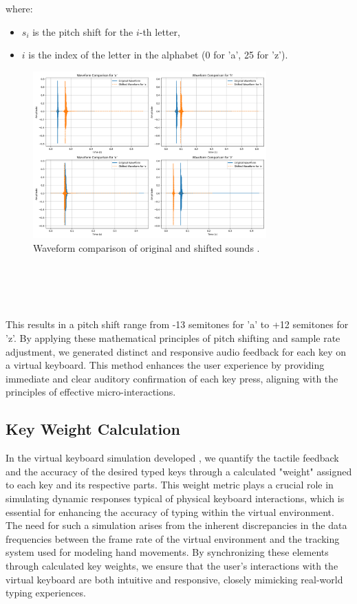 where:
\begin{itemize}
  \item \( s_i \) is the pitch shift for the \( i \)-th letter,
  \item \( i \) is the index of the letter in the alphabet (0 for 'a', 25 for 'z').
\end{itemize}

\begin{figure}[h!]
\centering
\includegraphics[width=0.8\textwidth]{Development/waveform_comparison_combined.png}
\caption{Waveform comparison of original and shifted sounds .}
\end{figure} 
\noindent \\\\\ \\ \\ 
This results in a pitch shift range from -13 semitones for 'a' to +12 semitones for 'z'.
By applying these mathematical principles of pitch shifting and sample rate adjustment, we generated distinct and responsive audio feedback for each key on a virtual keyboard. This method enhances the user experience by providing immediate and clear auditory confirmation of each key press, aligning with the principles of effective micro-interactions.

\subsection{Key Weight Calculation}
In the virtual keyboard simulation developed , we quantify the tactile feedback and the accuracy of the desired typed keys through a calculated "weight" assigned to each key and its respective parts. This weight metric plays a crucial role in simulating dynamic responses typical of physical keyboard interactions, which is essential for enhancing the accuracy of typing within the virtual environment. The need for such a simulation arises from the inherent discrepancies in the data frequencies between the frame rate of the virtual environment and the tracking system used for modeling hand movements. By synchronizing these elements through calculated key weights, we ensure that the user's interactions with the virtual keyboard are both intuitive and responsive, closely mimicking real-world typing experiences.



